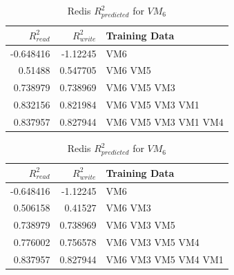 \documentclass{acm_proc_article-sp}
\begin{document}



\begin{table}
\centering
\caption{Redis $R_{predicted}^2$ for $VM_6$}
\begin{tabular}{|r|r|l|} \hline
$R_{read}^2$&$R_{write}^2$&Training Data\\ \hline
-0.648416 & -1.12245 & VM6 \\ \hline 
0.51488 & 0.547705 & VM6 VM5 \\ \hline 
0.738979 & 0.738969 & VM6 VM5 VM3 \\ \hline 
0.832156 & 0.821984 & VM6 VM5 VM3 VM1 \\ \hline 
0.837957 & 0.827944 & VM6 VM5 VM3 VM1 VM4 \\ \hline 
\hline\end{tabular}
\label{table:redis}
\end{table}

\begin{table}
\centering
\caption{Redis $R_{predicted}^2$ for $VM_6$}
\begin{tabular}{|r|r|l|} \hline
$R_{read}^2$&$R_{write}^2$&Training Data\\ \hline
-0.648416 & -1.12245 & VM6 \\ \hline 
0.506158 & 0.41527 & VM6 VM3 \\ \hline 
0.738979 & 0.738969 & VM6 VM3 VM5 \\ \hline 
0.776002 & 0.756578 & VM6 VM3 VM5 VM4 \\ \hline 
0.837957 & 0.827944 & VM6 VM3 VM5 VM4 VM1 \\ \hline 
\hline\end{tabular}
\label{table:redis}
\end{table}
\end{document}
